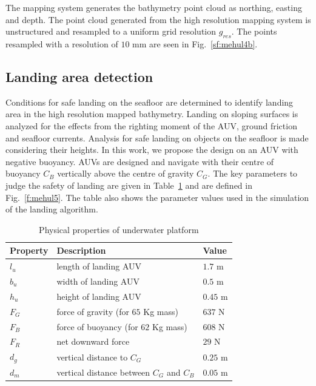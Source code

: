 The mapping system generates the bathymetry point cloud as northing, easting and depth. The point cloud generated from the high resolution mapping system is unstructured and resampled to a uniform grid resolution $g_{res}$. The points resampled with a resolution of $10$ mm are seen in Fig.~\ref{sf:mehul4b}. 

\subsection{Landing area detection}
\label{sub:landingarea}

Conditions for safe landing on the seafloor are determined to identify landing area in the high resolution mapped bathymetry. Landing on sloping surfaces is analyzed for the effects from the righting moment of the AUV, ground friction and seafloor currents. Analysis for safe landing on objects on the seafloor is made considering their heights. In this work, we propose the design on an AUV with negative buoyancy. AUVs are designed and navigate with their centre of buoyancy $C_B$ vertically above the centre of gravity $C_G$.  The key parameters to judge the safety of landing are given in Table~\ref{t:table2} and are defined in Fig.~\ref{f:mehul5}. The table also shows the parameter values used in the simulation of the landing algorithm.
 
\begin{table}[!ht]
\centering
\caption{Physical properties of underwater platform}
\begin{tabular}{ | p{4cm}  p{6cm} p{4cm} | }
\hline
\textbf{Property} & \textbf{Description} & \textbf{Value}\\ \hline 
$l_u$ & length of landing AUV & $1.7$ m\\
$b_u$ & width of landing AUV & $0.5$ m\\
$h_u$ & height of landing AUV & $0.45$ m\\
$F_G$ & force of  gravity (for $65$ Kg mass) & $637$ N \\
$F_B$ & force of buoyancy (for $62$ Kg mass) & $608$ N \\
$F_R$ & net  downward force  & $29$ N \\
$d_g$ & vertical distance to $C_G$ & $0.25$ m \\
$d_m$ & vertical distance between $C_G$ and $C_B$ & $0.05$ m \\
\hline
\end{tabular}
\label{t:table2}
\end{table}

